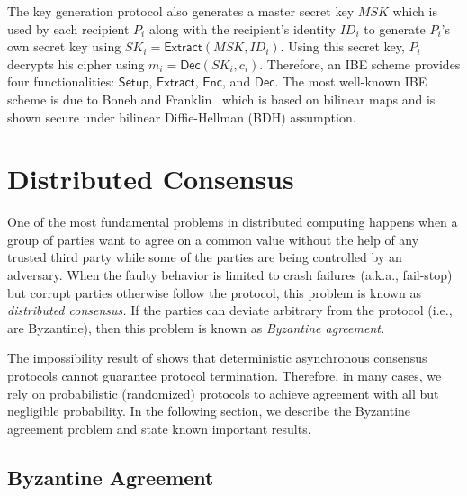 \documentclass[11pt]{article}
\theoremstyle{plain}
\begin{document}
The key generation protocol also generates a master secret key $MSK$
which is used by each recipient $P_{i}$ along with the recipient's
identity $ID_{i}$ to generate $P_{i}$'s own secret key using $SK_{i}=\mathsf{Extract}(MSK,ID_{i})$.
Using this secret key, $P_{i}$ decrypts his cipher using $m_{i}=\mathsf{Dec}(SK_{i},c_{i})$.
Therefore, an IBE scheme provides four functionalities: $\mathsf{Setup}$,
$\mathsf{Extract}$, $\mathsf{Enc}$, and $\mathsf{Dec}$. The most
well-known IBE scheme is due to Boneh and Franklin~\cite{Boneh2001ibe}
which is based on bilinear maps and is shown secure under bilinear
Diffie-Hellman (BDH) assumption.

\section{Distributed Consensus}

One of the most fundamental problems in distributed computing happens
when a group of parties want to agree on a common value without the
help of any trusted third party while some of the parties are being
controlled by an adversary. When the faulty behavior is limited to
crash failures (a.k.a., fail-stop) but corrupt parties otherwise follow
the protocol, this problem is known as\emph{ distributed consensus.
}If the parties can deviate arbitrary from the protocol (i.e., are
Byzantine), then this problem is known as \emph{Byzantine agreement.}

The impossibility result of \cite{FLP} shows that deterministic asynchronous
consensus protocols cannot guarantee protocol termination. Therefore,
in many cases, we rely on probabilistic (randomized) protocols to
achieve agreement with all but negligible probability. In the following
section, we describe the Byzantine agreement problem and state known
important results.

\subsection{Byzantine Agreement}
\end{document}
